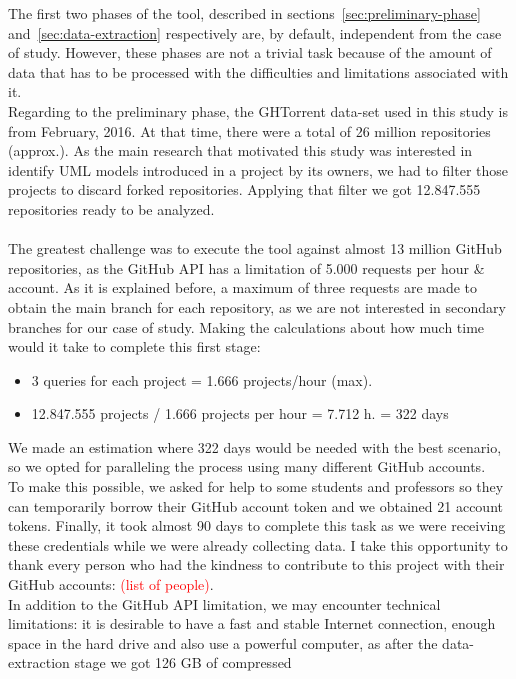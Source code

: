\documentclass[a4paper, 12pt]{book}
\begin{document}
The first two phases of the tool, described in sections~\ref{sec:preliminary-phase} and~\ref{sec:data-extraction} respectively
are, by default, independent from the case of study. However, these phases are not a trivial task because of the amount of
data that has to be processed with the difficulties and limitations associated with it.\\
Regarding to the preliminary phase, the GHTorrent data-set used in this study is from February, 2016. At that time, there were
a total of 26 million repositories (approx.). As the main research that motivated this study was interested in identify UML
models introduced in a project by its owners, we had to filter those projects to discard forked repositories. Applying that
filter we got 12.847.555 repositories ready to be analyzed.\\\\
The greatest challenge was to execute the tool against almost 13 million GitHub repositories, as the GitHub API has a limitation
of 5.000 requests per hour \& account. As it is explained before, a maximum of three requests are made to obtain the main
branch for each repository, as we are not interested in secondary branches for our case of study. Making the calculations about
how much time would it take to complete this first stage:
\begin{itemize}
  \item 3 queries for each project = 1.666 projects/hour (max).
  \item 12.847.555 projects / 1.666 projects per hour = 7.712 h. = 322 days
\end{itemize}
We made an estimation where 322 days would be needed with the best scenario, so we opted for paralleling the process using many
different GitHub accounts.\\
To make this possible, we asked for help to some students and professors so they can temporarily borrow their GitHub account
token and we obtained 21 account tokens. Finally, it took almost 90 days to complete this task as we were receiving these credentials
while we were already collecting data. I take this opportunity to thank every person who had the kindness to contribute to this project
with their GitHub accounts: \textcolor{red}{(list of people)}.\\
In addition to the GitHub API limitation, we may encounter technical limitations: it is desirable to have a fast and stable Internet
connection, enough space in the hard drive and also use a powerful computer, as after the data-extraction stage we got 126 GB of compressed
\end{document}

